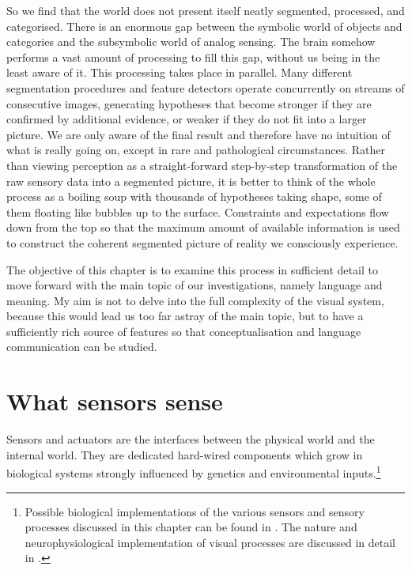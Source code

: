 \enlargethispage{1\baselineskip}
So we find that the world does not present itself neatly segmented, 
processed, and categorised. There is an enormous 
gap between the symbolic world of objects and categories
and the subsymbolic world of analog sensing. 
The brain somehow performs a vast amount of processing
to fill this gap, without us being in the least aware of it. 
This processing takes place in parallel. Many different
segmentation procedures and feature detectors 
operate concurrently on streams of consecutive images, 
generating hypotheses that become stronger if they are
confirmed by additional evidence, or weaker if 
they do not fit into a larger picture. We are only 
aware of the final result and therefore have no 
intuition of what is really going on, except
in rare and pathological circumstances. 
Rather than viewing perception as a straight-forward step-by-step
transformation of the raw sensory data into a segmented
picture, it is better to think of the whole process
as a boiling soup with thousands of hypotheses taking
shape, some of them floating like bubbles up to the surface. Constraints
and expectations flow down from the top so that the maximum 
amount of available information is used to construct the 
coherent segmented picture of reality we consciously experience. 

The objective of this chapter is to examine this 
process in sufficient detail to move forward with the main
topic of our investigations, namely language and meaning. My 
aim is not to delve into the full complexity of the 
visual system, because this would lead us too far 
astray of the main topic, but to have a sufficiently 
rich source of features so that conceptualisation and 
language communication can be studied. 

\section{What sensors sense}

Sensors and actuators are the interfaces between the physical
world and the internal world. 
They are dedicated hard-wired components which grow in biological 
systems strongly influenced by genetics and environmental inputs.\footnote{Possible 
biological implementations of the various 
sensors and sensory processes discussed in this chapter 
can be found in \cite{Churchland:1992}. The 
nature and neurophysiological implementation of visual
processes are discussed in detail in \cite{Zeki:1993}.}

